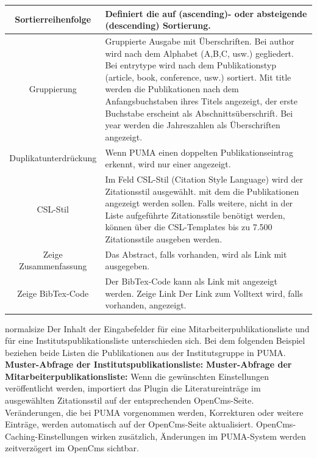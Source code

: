 \begin{longtable}{|c|p{7cm}|}
Sortierreihenfolge &	Definiert die auf (ascending)- oder absteigende (descending) Sortierung.\\ \hline
Gruppierung &	Gruppierte Ausgabe mit Überschriften. Bei author wird nach dem Alphabet (A,B,C, usw.) gegliedert. Bei entrytype wird nach dem Publikationstyp (article, book, conference, usw.) sortiert. Mit title werden die Publikationen nach dem Anfangsbuchstaben ihres Titels angezeigt, der erste Buchstabe erscheint als Abschnittsüberschrift. Bei year werden die Jahreszahlen als Überschriften angezeigt.\\ \hline
Duplikatunterdrückung &	Wenn PUMA einen doppelten Publikationseintrag erkennt, wird nur einer angezeigt.\\ \hline
CSL-Stil &	Im Feld CSL-Stil (Citation Style Language) wird der Zitationsstil ausgewählt. mit dem die Publikationen angezeigt werden sollen. Falls weitere, nicht in der Liste aufgeführte Zitationsstile benötigt werden, können über die CSL-Templates bis zu 7.500 Zitationsstile ausgeben werden.\\ \hline
Zeige Zusammenfassung& 	Das Abstract, falls vorhanden, wird als Link mit ausgegeben.\\ \hline
Zeige BibTex-Code &	Der BibTex-Code kann als Link mit angezeigt werden.
Zeige Link 	Der Link zum Volltext wird, falls vorhanden, angezeigt.\\ \hline
\end{longtable}
normalsize
Der Inhalt der Eingabefelder für eine Mitarbeiterpublikationsliste und für eine Institutspublikationsliste unterschieden sich. Bei dem folgenden Beispiel beziehen beide Listen die Publikationen aus der Institutsgruppe in PUMA.\newline\newline
\textbf{Muster-Abfrage der Institutspublikationsliste:}\newline %
\textbf {Muster-Abfrage der Mitarbeiterpublikationsliste:}\newline%
\newline
Wenn die gewünschten Einstellungen veröffentlicht werden, importiert das Plugin die Literatureinträge im ausgewählten Zitationsstil auf der entsprechenden OpenCms-Seite. Veränderungen, die bei PUMA vorgenommen werden, Korrekturen oder weitere Einträge, werden automatisch auf der OpenCms-Seite aktualisiert. OpenCms-Caching-Einstellungen wirken zusätzlich, Änderungen im PUMA-System werden zeitverzögert im OpenCms sichtbar.
